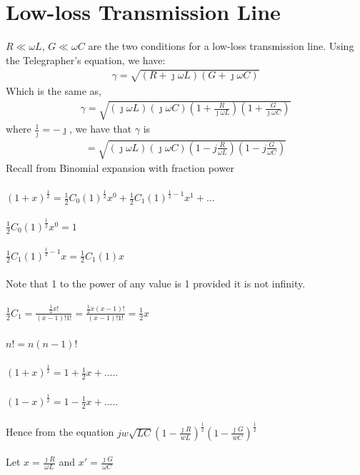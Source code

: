 \section{Low-loss Transmission Line}
$R \ll \omega L$, $G \ll \omega C$ are the two conditions for a low-loss transmission line. Using the Telegrapher's equation, we have:
\begin{align*}
\gamma = \sqrt{(R + \jmath\omega L)(G + \jmath\omega C)}
\end{align*}
Which is the same as,
\begin{align*}
\gamma = \sqrt{{(\jmath\omega L)(\jmath\omega C)(1 + \frac{R}{\jmath\omega L})(1 + \frac{G}{\jmath\omega C})}}
\end{align*}
where $\frac{1}{\jmath} = -\jmath$, we have that $\gamma$ is
\begin{align*}
= \sqrt{{(\jmath\omega L)(\jmath\omega C)(1 - j\frac{R}{\omega L})(1 - j\frac{G}{\omega C})}}
\end{align*}
Recall from Binomial expansion with fraction power\\\\
$(1 + x)^{\frac{1}{2}} = \frac{1}{2}C_0(1)^{\frac{1}{2}}x^0 + \frac{1}{2}C_1(1)^{{\frac{1}{2}} - 1}x^1 + ...$\\\\
$\frac{1}{2}C_0(1)^{\frac{1}{2}}x^0 = 1$\\\\
$\frac{1}{2}C_1(1)^{\frac{1}{2} - 1}x = \frac{1}{2}C_1(1)x$\\\\
Note that 1 to the power of any value is 1 provided it is not infinity.\\\\
$\frac{1}{2}C_1 = \frac{\frac{1}{2}x!}{(x - 1)!1!} = \frac{\frac{1}{2}x(x-1)!}{(x-1)!1!} = \frac{1}{2}x$\\\\
$n! = n(n - 1)!$\\\\
$(1 + x)^{\frac{1}{2}} = 1 + \frac{1}{2}x + .....$\\\\
$(1 - x)^{\frac{1}{2}} = 1 - \frac{1}{2}x + .....$\\\\
Hence from the equation
$jw\sqrt{LC}(1 - \frac{\jmath R}{wL})^{\frac{1}{2}}(1 - \frac{\jmath G}{wC})^{\frac{1}{2}}$\\\\
Let $x = \frac{\jmath R}{\omega L}$ and $x' = \frac{\jmath G}{\omega C}$\\\\
